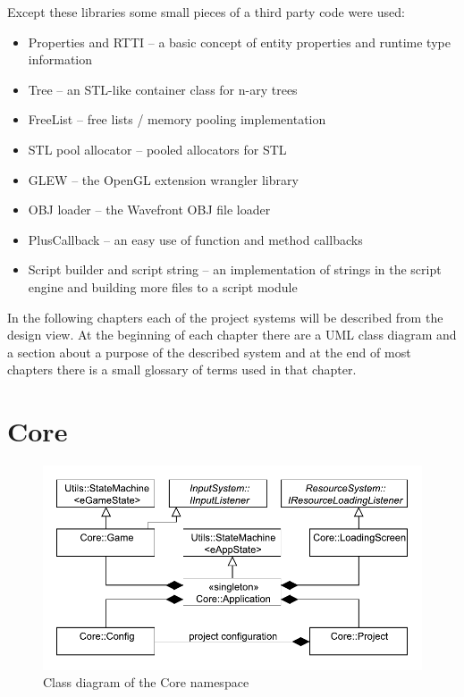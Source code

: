 \documentclass[a4paper, 12pt]{report}
\begin{document}
Except these libraries some small pieces of a third party code were used:

\begin{itemize}
  \item Properties and RTTI\cite{gpg5} -- a basic concept of entity properties and runtime type information
  \item Tree\cite{tree} -- an STL-like container class for n-ary trees
  \item FreeList\cite{gpg5} -- free lists / memory pooling implementation
  \item STL pool allocator\cite{allocator} -- pooled allocators for STL
  \item GLEW\cite{glew} -- the OpenGL extension wrangler library
  \item OBJ loader\cite{objloader} -- the Wavefront OBJ file loader
  \item PlusCallback\cite{pluscallback} -- an easy use of function and method callbacks
  \item Script builder and script string\cite{angelscript} -- an implementation of strings in the script engine and building more files to a script module
\end{itemize}

In the following chapters each of the project systems will be described from the design view. At the beginning of each chapter there are a UML class diagram
and a section about a purpose of the described system and at the end of most chapters there is a small glossary of terms used in that chapter.


\chapter{Core}

\begin{figure}[htbp]
	\centering
		\includegraphics[width=1\textwidth]{CoreClassDiagram.pdf}
	\caption{Class diagram of the Core namespace}
	\label{fig:core-diagram}
\end{figure}
\end{document}
